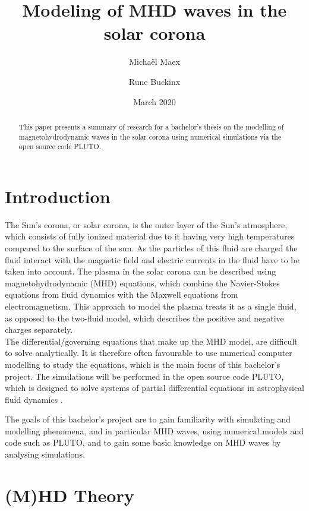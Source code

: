 \documentclass[a4paper]{article}
\title{Modeling of MHD waves in the solar corona}
\author{Micha\"el Maex \and Rune Buckinx}
\date{March 2020}
\begin{document}
\maketitle

\begin{abstract}
    This paper presents a summary of research for a bachelor's thesis on the modelling of magnetohydrodynamic waves in the solar corona using numerical simulations via the open source code PLUTO. 
\end{abstract}
\tableofcontents

\listoftodos

\newpage
\section{Introduction} \label{sec:introduction}
The Sun's corona, or solar corona, is the outer layer of the Sun's atmosphere, which consists of fully ionized material due to it having very high temperatures compared to the surface of the sun. 
As the particles of this fluid are charged the fluid interact with the magnetic field and electric currents in the fluid have to be taken into account.  
The plasma in the solar corona can be described using magnetohydrodynamic (MHD) equations, which combine the Navier-Stokes equations from fluid dynamics with the Maxwell equations from electromagnetism. 
This approach to model the plasma treats it as a single fluid, as opposed to the two-fluid model, which describes the positive and negative charges separately. \\

The differential/governing equations that make up the MHD model, are difficult to solve analytically. 
It is therefore often favourable to use numerical computer modelling to study the equations, which is the main focus of this bachelor's project. 
The simulations will be performed in the open source code PLUTO, which is designed to solve systems of partial differential equations in astrophysical fluid dynamics \cite{mignone2011pluto}. 

The goals of this bachelor's project are to gain familiarity with simulating and modelling phenomena, and in particular MHD waves, using numerical models and code such as PLUTO, and to gain some basic knowledge on MHD waves by analysing simulations.

\section{(M)HD Theory} \label{sec:(m)hd_theory}
\end{document}
